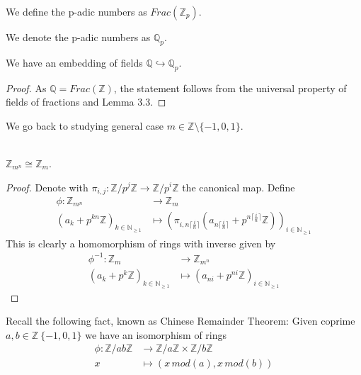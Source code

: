\begin{definition}
We define the p-adic numbers as $Frac( \mathbb{Z}_p )$.
\end{definition}

\begin{notation}
We denote the p-adic numbers as $ \mathbb{Q}_p$.
\end{notation}

\begin{corollary}
We have an embedding of fields $ \mathbb{Q} \hookrightarrow \mathbb{Q}_p$.
\end{corollary}

\begin{proof}
As $\mathbb{Q} = Frac( \mathbb{Z} )$, the statement follows from the universal property of fields of fractions and Lemma 3.3.
\end{proof}

We go back to studying general case $m \in \mathbb{Z} \setminus \{-1,0,1 \}$. \\~\\

\begin{lemma}
$\mathbb{Z}_{m^n} \cong \mathbb{Z}_m$.
\end{lemma}

\begin{proof} 
Denote with $\pi_{i,j}: \mathbb{Z} / p^j \mathbb{Z} \rightarrow \mathbb{Z} / p^i \mathbb{Z}$ the canonical map.
Define \begin{align*} \phi: \mathbb{Z}_{m^n} & \longrightarrow \mathbb{Z}_m\\ (a_k + p^{kn}\mathbb{Z})_{k \in \mathbb{N}_{\geq 1}}& \longmapsto (\pi_{i, n \lceil \frac{i}{n} \rceil} (a_{n \lceil \frac{i}{n} \rceil} + p^{n \lceil \frac{i}{n} \rceil} \mathbb{Z} ))_{i \in \mathbb{N}_{\geq 1}}
\end{align*}
This is clearly a homomorphism of rings with inverse given by 
\begin{align*} \phi^{-1}: \mathbb{Z}_m & \longrightarrow \mathbb{Z}_{m^n}\\ (a_k + p^k\mathbb{Z})_{k \in \mathbb{N}_{\geq 1}}& \longmapsto ( a_{ni} + p^{ni} \mathbb{Z} )_{i \in \mathbb{N}_{\geq 1}} 
\end{align*}
\end{proof}


Recall the following fact, known as Chinese Remainder Theorem: \newline
Given coprime $a,b \in \mathbb{Z} \ \{ -1, 0, 1 \}$ we have an isomorphism of rings
\begin{align*} \phi: \mathbb{Z} /ab \mathbb{Z} & \longrightarrow \mathbb{Z} / a \mathbb{Z} \times \mathbb{Z} /b \mathbb{Z} \\ x & \longmapsto (x \, mod (a), x \, mod (b))
\end{align*}

